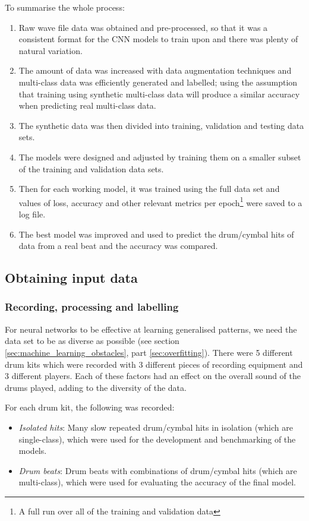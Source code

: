 \documentclass[12pt]{article}
\begin{document}
	To summarise the whole process:	
	\begin{enumerate}
	    \item Raw wave file data was obtained and pre-processed, so that it was a consistent format for the CNN models to train upon and there was plenty of natural variation.
	    \item The amount of data was increased with data augmentation techniques and multi-class data was efficiently generated and labelled; using the assumption that training using synthetic multi-class data will produce a similar accuracy when predicting real multi-class data.
	    \item The synthetic data was then divided into training, validation and testing data sets.
	    \item The models were designed and adjusted by training them on a smaller subset of the training and validation data sets.
	    \item Then for each working model, it was trained using the full data set and values of loss, accuracy and other relevant metrics per epoch\footnote{A full run over all of the training and validation data} were saved to a log file.
	    \item The best model was improved and used to predict the drum/cymbal hits of data from a real beat and the accuracy was compared.
	\end{enumerate}
	
	\subsection{Obtaining input data}
	\subsubsection{Recording, processing and labelling}
	
	For neural networks to be effective at learning generalised patterns, we need the data set to be as diverse as possible (see section \ref{sec:machine_learning_obstacles}, part \ref{sec:overfitting}). There were 5 different drum kits which were recorded with 3 different pieces of recording equipment and 3 different players. Each of these factors had an effect on the overall sound of the drums played, adding to the diversity of the data.\medskip
	
	For each drum kit, the following was recorded:
	\begin{itemize}
	    \item \textit{Isolated hits}: Many slow repeated drum/cymbal hits in isolation (which are single-class), which were used for the development and benchmarking of the models.
	    \item \textit{Drum beats}: Drum beats with combinations of drum/cymbal hits (which are multi-class), which were used for evaluating the accuracy of the final model. 
	\end{itemize} \medskip
	
\end{document}
